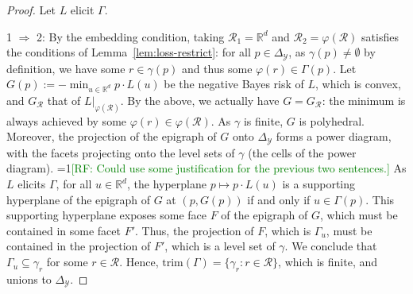 \documentclass[anon,12pt]{colt2019}
\newcommand{\Comments}{1}
\newcommand{\mynote}[2]{\ifnum\Comments=1\textcolor{#1}{#2}\fi}
\newcommand{\raf}[1]{\mynote{green}{[RF: #1]}}
\newcommand{\reals}{\mathbb{R}}
\newcommand{\simplex}{\Delta_\Y}
\newcommand{\R}{\mathcal{R}}
\newcommand{\Y}{\mathcal{Y}}
\newcommand{\trim}{\mathrm{trim}}
\DeclareMathOperator*{\argmin}{arg\,min}
\begin{document}
\begin{proof}
  Let $L$ elicit $\Gamma$.

  1 $\Rightarrow$ 2:
  By the embedding condition, taking $\R_1 = \reals^d$ and $\R_2 = \varphi(\R)$ satisfies the conditions of Lemma~\ref{lem:loss-restrict}: for all $p\in\simplex$, as $\gamma(p) \neq \emptyset$ by definition, we have some $r\in\gamma(p)$ and thus some $\varphi(r) \in \Gamma(p)$.
  Let $G(p) := -\min_{u\in\reals^d} p\cdot L(u)$ be the negative Bayes risk of $L$, which is convex, and $G_{\R}$ that of $L|_{\varphi(\R)}$.
  By the above, we actually have $G = G_\R$: the minimum is always achieved by some $\varphi(r) \in \varphi(\R)$.
  As $\gamma$ is finite, $G$ is polyhedral.
  Moreover, the projection of the epigraph of $G$ onto $\simplex$ forms a power diagram, with the facets projecting onto the level sets of $\gamma$ (the cells of the power diagram).
  \raf{Could use some justification for the previous two sentences.}
  As $L$ elicits $\Gamma$, for all $u\in\reals^d$, the hyperplane $p\mapsto p\cdot L(u)$ is a supporting hyperplane of the epigraph of $G$ at $(p,G(p))$ if and only if $u\in\Gamma(p)$.
  This supporting hyperplane exposes some face $F$ of the epigraph of $G$, which must be contained in some facet $F'$.
  Thus, the projection of $F$, which is $\Gamma_u$, must be contained in the projection of $F'$, which is a level set of $\gamma$.
  We conclude that $\Gamma_u \subseteq \gamma_r$ for some $r\in\R$.
  Hence, $\trim(\Gamma) = \{\gamma_r : r\in\R\}$, which is finite, and unions to $\simplex$.




\end{proof}
\end{document}
